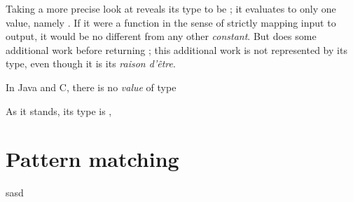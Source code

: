 \documentclass[10 pt]{article}
\begin{document}
Taking a more precise look at  reveals its type to be ; it evaluates to only one value, namely \pcode{()}. If it were a function in the sense of strictly mapping input to output, it would be no different from any other \pcode{()} \emph{constant}. But  does some additional work before returning \pcode{()}; this additional work is not represented by its type, even though it is its \emph{raison d'être}. 

In Java and C, there is no \emph{value} of type 

 As it stands, its type is , 

\newpage

\section{Pattern matching}
sasd
\newpage

\section{}

\printbibliography
\end{document}
